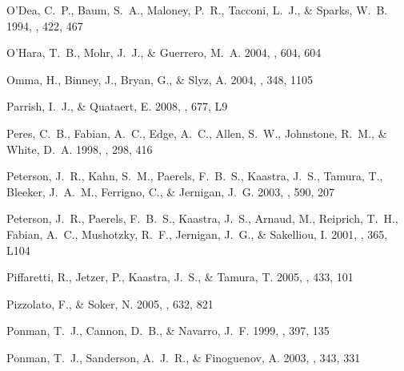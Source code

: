 \documentclass[12pt,preprint]{aastex}
\begin{document}
\begin{thebibliography}{137}
{O'Dea}, C.~P., {Baum}, S.~A., {Maloney}, P.~R., {Tacconi}, L.~J., \& {Sparks},
  W.~B. 1994, \apj, 422, 467

{O'Hara}, T.~B., {Mohr}, J.~J., \& {Guerrero}, M.~A. 2004, \apj, 604, 604

{Omma}, H., {Binney}, J., {Bryan}, G., \& {Slyz}, A. 2004, \mnras, 348, 1105

{Parrish}, I.~J., \& {Quataert}, E. 2008, \apjl, 677, L9

{Peres}, C.~B., {Fabian}, A.~C., {Edge}, A.~C., {Allen}, S.~W., {Johnstone},
  R.~M., \& {White}, D.~A. 1998, \mnras, 298, 416

{Peterson}, J.~R., {Kahn}, S.~M., {Paerels}, F.~B.~S., {Kaastra}, J.~S.,
  {Tamura}, T., {Bleeker}, J.~A.~M., {Ferrigno}, C., \& {Jernigan}, J.~G. 2003,
  \apj, 590, 207

{Peterson}, J.~R., {Paerels}, F.~B.~S., {Kaastra}, J.~S., {Arnaud}, M.,
  {Reiprich}, T.~H., {Fabian}, A.~C., {Mushotzky}, R.~F., {Jernigan}, J.~G., \&
  {Sakelliou}, I. 2001, \aap, 365, L104

{Piffaretti}, R., {Jetzer}, P., {Kaastra}, J.~S., \& {Tamura}, T. 2005, \aap,
  433, 101

{Pizzolato}, F., \& {Soker}, N. 2005, \apj, 632, 821

{Ponman}, T.~J., {Cannon}, D.~B., \& {Navarro}, J.~F. 1999, \nat, 397, 135

{Ponman}, T.~J., {Sanderson}, A.~J.~R., \& {Finoguenov}, A. 2003, \mnras, 343,
  331


\end{thebibliography}
\end{document}
